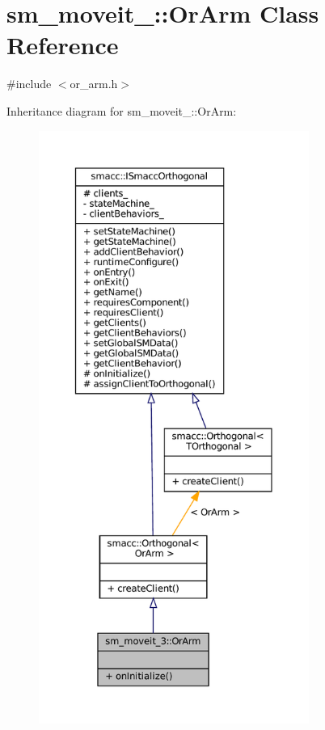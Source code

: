 \hypertarget{classsm__moveit__3_1_1OrArm}{}\section{sm\+\_\+moveit\+\_\+:\+:Or\+Arm Class Reference}
\label{classsm__moveit__3_1_1OrArm}


{\ttfamily \#include $<$or\+\_\+arm.\+h$>$}



Inheritance diagram for sm\+\_\+moveit\+\_\+:\+:Or\+Arm\+:
\nopagebreak
\begin{figure}[H]
\begin{center}
\leavevmode
\includegraphics[height=550pt]{classsm__moveit__3_1_1OrArm__inherit__graph}
\end{center}
\end{figure}


